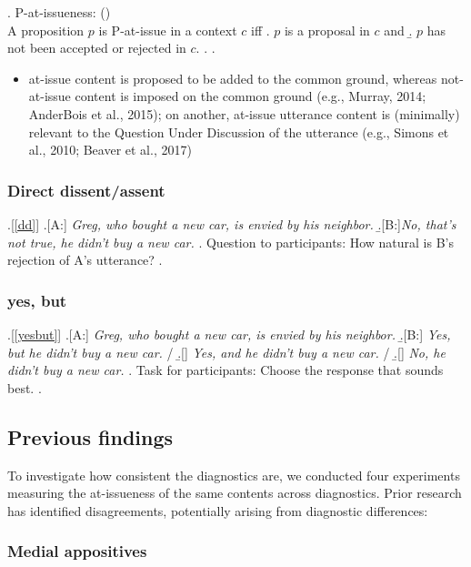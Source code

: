 \documentclass[times,linguex]{glossa}
\begin{document}
     \ex. P-at-issueness: \hfill (\citealt{koev_apposition_2013,koev_notions_2018})\\
      A proposition $p$ is P-at-issue in a context $c$ iff
      \a. $p$ is a proposal in $c$ and
      \b. $p$ has not been accepted or rejected in $c$.
      \z.
    \z.

    \begin{itemize}
      \item at-issue content is proposed to be added to the common ground, whereas not-at-issue content is imposed on the common ground (e.g., Murray, 2014; AnderBois et al., 2015); on another, at-issue utterance content is (minimally) relevant to the Question Under Discussion of the utterance (e.g., Simons et al., 2010; Beaver et al., 2017)
    \end{itemize}

  \subsubsection{Direct dissent/assent}

  \ex.[\ref{dd}]
    \a.[A:] \emph{Greg, who bought a new car, is envied by his neighbor.}
    \b.[B:]\emph{No, that's not true, he didn't buy a new car.}
    \z.
  Question to participants: How natural is B's rejection of A's utterance?
  \z.

  \subsubsection{yes, but}

  \ex.[\ref{yesbut}]%
    \a.[A:] \emph{Greg, who bought a new car, is envied by his neighbor.}
    \b.[B:] \emph{Yes, but he didn't buy a new car.} /
    \b.[] \emph{Yes, and he didn't buy a new car.} /
    \b.[] \emph{No, he didn't buy a new car.}
    \z.
    Task for participants: Choose the response that sounds best.
  \z.

  \subsection{Previous findings}
    To investigate how consistent the diagnostics are, we conducted four experiments measuring the at-issueness of the same contents across diagnostics. Prior research has identified disagreements, potentially arising from diagnostic differences:

    \subsubsection{Medial appositives}  
\end{document}
